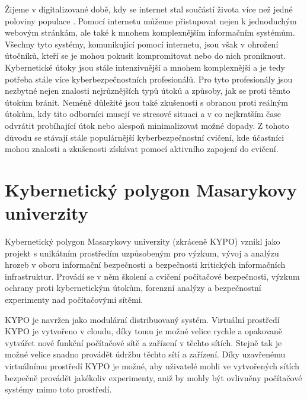 \documentclass[
  digital, %
  twoside, %
  table,   %
  lof,     %
  lot,     %
]{fithesis3}
\begin{document}
Žijeme v digitalizované době, kdy se internet stal součástí života více než jedné poloviny populace \cite{worldStats}. Pomocí internetu můžeme přistupovat nejen k jednoduchým webovým stránkám, ale také k mnohem komplexnějším informačním systémům. Všechny tyto systémy, komunikující pomocí internetu, jsou však v ohrožení útočníků, kteří se je mohou pokusit kompromitovat nebo do nich proniknout. Kybernetické útoky jsou stále intenzivnější a mnohem komplexnější a je tedy potřeba stále více kyberbezpečnostních profesionálů. Pro tyto profesionály jsou nezbytné nejen znalosti nejrůznějších typů útoků a způsoby, jak se proti těmto útokům bránit. Neméně důležité jsou také zkušenosti s obranou proti reálným útokům, kdy tito odborníci musejí ve stresové situaci a v co nejkratším čase odvrátit probíhající útok nebo alespoň minimalizovat možné dopady. Z tohoto důvodu se stávají stále populárnější kyberbezpečnostní cvičení, kde účastníci mohou znalosti a zkušenosti získávat pomocí aktivního zapojení do cvičení.

\section{Kybernetický polygon Masarykovy univerzity}

Kybernetický polygon Masarykovy univerzity (zkráceně KYPO) vznikl jako projekt s unikátním prostředím uzpůsobeným pro výzkum, vývoj a analýzu hrozeb v oboru informační bezpečnosti a bezpečnosti kritických informačních infrastruktur. Provádí se v něm školení a cvičení počítačové bezpečnosti, výzkum ochrany proti kybernetickým útokům, forenzní analýzy a bezpečnostní experimenty nad počítačovými sítěmi.

KYPO je navržen jako modulární distribuovaný systém. \cite{Vykopal2017KYPOCases} Virtuální prostředí KYPO je vytvořeno v cloudu, díky tomu je možné velice rychle a opakovaně vytvářet nové funkční počítačové sítě a zařízení v těchto sítích. Stejně tak je možné velice snadno provádět údržbu těchto sítí a zařízení. Díky uzavřenému virtuálnímu prostředí KYPO je možné, aby uživatelé mohli ve vytvořených sítích bezpečně provádět jakékoliv experimenty, aniž by mohly být ovlivněny počítačové systémy mimo toto prostředí.
\end{document}
